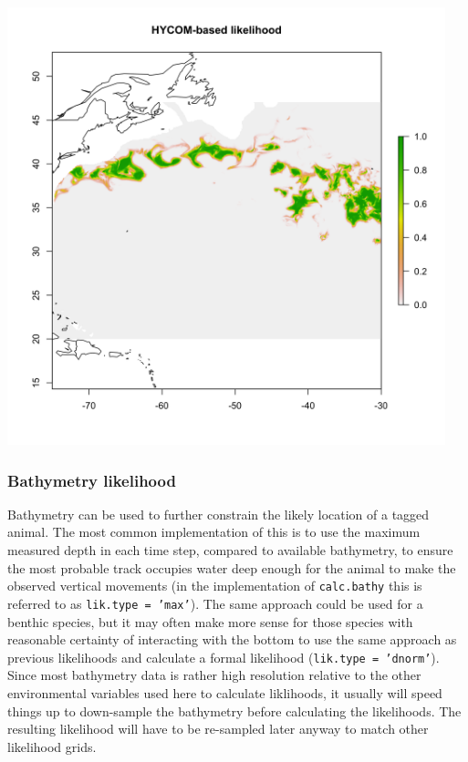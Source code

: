\documentclass{article}\usepackage[]{graphicx}\usepackage[]{color}
\begin{document}
\includegraphics[width=5in, keepaspectratio]{./example_hycom_lik.png}


\subsubsection{Bathymetry likelihood}

Bathymetry can be used to further constrain the likely location of a tagged animal. The most common implementation of this is to use the maximum measured depth in each time step, compared to available bathymetry, to ensure the most probable track occupies water deep enough for the animal to make the observed vertical movements (in the implementation of \texttt{calc.bathy} this is referred to as \texttt{lik.type = 'max'}). The same approach could be used for a benthic species, but it may often make more sense for those species with reasonable certainty of interacting with the bottom to use the same approach as previous likelihoods and calculate a formal likelihood (\texttt{lik.type = 'dnorm'}). Since most bathymetry data is rather high resolution relative to the other environmental variables used here to calculate liklihoods, it usually will speed things up to down-sample the bathymetry before calculating the likelihoods. The resulting likelihood will have to be re-sampled later anyway to match other likelihood grids.
\end{document}
